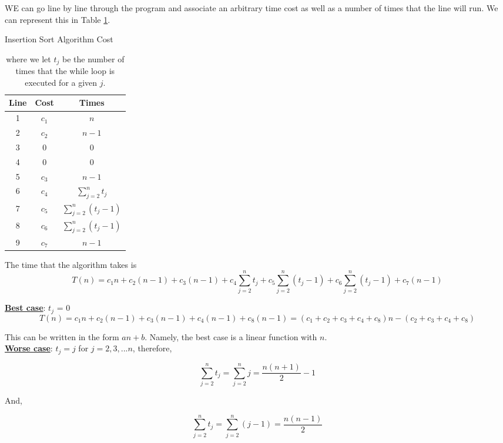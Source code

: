 \documentclass[]{article}
\begin{document}
WE can go line by line through the program and associate an arbitrary time cost as well as a number of times that the line will run. We can represent this in Table \ref{tbl:insertion-sort-cost}. 

\begin{center}
	\begin{table}[h!]\centering
		\caption{Insertion Sort Algorithm Cost}\label{tbl:insertion-sort-cost}
		\begin{tabular}{|c|c|c|}
			\hline
			Line   &Cost   &Times\\\hline
			 1     & $c_1$     & $n$\\
			 2     & $c_2$     & $n-1$\\
			 3     & $0$      & $0$\\
			 4     & $0$      & $0$\\
			 5     & $c_3$     & $n-1$\\
			 6     & $c_4$     & $\sum_{j=2}^n t_j$\\
			 7     & $c_5$     & $\sum_{j=2}^n (t_j-1)$\\
			 8     & $c_6$     & $\sum_{j=2}^n (t_j-1)$\\
			 9     & $c_7$     &$n-1$\\\hline
		\end{tabular}
		\caption*{
			\relax
			\relax
			where we let $t_j$ be the number of times that the while loop is executed for a given $j$.
		}
	\end{table}
\end{center}

The time that the algorithm takes is
\begin{equation*}
	T(n) = c_1n+c_2(n-1)+c_3(n-1) + c_4\sum_{j=2}^n t_j + c_5\sum_{j=2}^n (t_j-1) + c_6\sum_{j=2}^n (t_j-1) + c_7(n-1)
\end{equation*}

\underline{\textbf{Best case}}: $t_j$ = 0
$$
T(n) = c_1n + c_2(n-1) + c_3(n-1) + c_4(n-1) + c_8(n-1)
= (c_1+c_2+c_3+c_4+c_8)n - (c_2+c_3+c_4+c_8)
$$

This can be written in the form $an+b$. Namely, the best case is a linear function with $n$.\\

\underline{\textbf{Worse case}}: $t_j = j$ for $j = 2, 3, ... n$, therefore,

\[ \sum_{j=2}^n t_j = \sum_{j=2}^n j = \frac{n(n+1)}{2} - 1 \]

And,

\[\sum_{j=2}^n t_j = \sum_{j=2}^n (j-1) = \frac{n(n-1)}{2}\]
\end{document}

